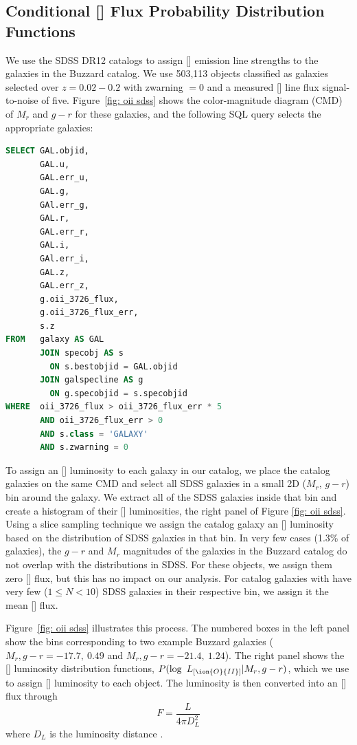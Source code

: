 \documentclass[fleqn,usenatbib]{mnras}
\begin{document}
\subsection{Conditional {\rm[]} Flux Probability Distribution Functions}\label{sec: oii luminosity}
We use the SDSS DR12 \citep{Alam2015} catalogs to assign [] emission line strengths to the galaxies in the Buzzard catalog. We use 503,113 objects classified as galaxies selected over $z = 0.02 - 0.2$ with {\sc zwarning $=0$} and a measured [] line flux signal-to-noise of five. Figure~\ref{fig: oii sdss} shows the color-magnitude diagram (CMD) of $M_r$ and $g-r$ for these galaxies, and the following SQL query selects the appropriate galaxies:
\begin{lstlisting}[language=SQL]
SELECT GAL.objid, 
       GAL.u, 
       GAL.err_u, 
       GAL.g, 
       GAl.err_g, 
       GAL.r, 
       GAL.err_r, 
       GAL.i, 
       GAl.err_i, 
       GAL.z, 
       GAL.err_z, 
       g.oii_3726_flux, 
       g.oii_3726_flux_err, 
       s.z 
FROM   galaxy AS GAL 
       JOIN specobj AS s 
         ON s.bestobjid = GAL.objid 
       JOIN galspecline AS g 
         ON g.specobjid = s.specobjid 
WHERE  oii_3726_flux > oii_3726_flux_err * 5 
       AND oii_3726_flux_err > 0 
       AND s.class = 'GALAXY' 
       AND s.zwarning = 0 
\end{lstlisting}

To assign an [] luminosity to each galaxy in our catalog, we place the catalog galaxies on the same CMD and select all SDSS galaxies in a small 2D ($M_r$, $g-r$) bin around the galaxy. We extract all of the SDSS galaxies inside that bin and create a histogram of their [] luminosities, the right panel of Figure \ref{fig: oii sdss}. Using a slice sampling technique \citep{Neal1997} we assign the catalog galaxy an [] luminosity based on the distribution of SDSS galaxies in that bin. In very few cases (1.3\% of galaxies), the $g-r$ and $M_r$ magnitudes of the galaxies in the Buzzard catalog do not overlap with the distributions in SDSS. For these objects, we assign them zero [] flux, but this has no impact on our analysis. For catalog galaxies with have very few ($1\leq N<10$) SDSS galaxies in their respective bin, we assign it the mean [] flux. 

Figure~\ref{fig: oii sdss} illustrates this process. The numbered boxes in the left panel show the bins corresponding to two example Buzzard galaxies ($M_r, g-r = -17.7,~0.49$ and $M_r, g-r = -21.4,~1.24$). The right panel shows the [] luminosity distribution functions, $P(\log\ L_{[\ion{O}{II}]}| M_r, g-r)$, which we use to assign [] luminosity to each object. The luminosity is then converted into an [] flux through 
\begin{equation}
	F = \frac{L}{4\pi D_L^2}
\end{equation}
where $D_L$ is the luminosity distance .
\end{document}
